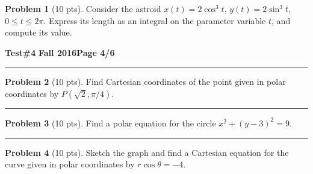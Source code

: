 \documentclass[12pt]{article}
\theoremstyle{definition}
\newtheorem{problem}{Problem}
\begin{document}
\begin{problem}[10 pts]
Consider the astroid $x(t) = 2\cos^3 t$, $y(t) = 2\sin^3 t$, $0 \leq t \leq 2\pi$.  Express its length as an integral on the parameter variable $t$, and compute its value.
\end{problem}
\vspace{4.5cm}
\begin{flushright}
\end{flushright}
\newpage

\hfill{\large\bf Test\#4}\hfill{\large\bf
  Fall 2016}\hfill{\large\bf Page 4/6}\hrule

\bigskip
\begin{problem}[10 pts]
Find Cartesian coordinates of the point given in polar coordinates by $P(\sqrt{2}, \pi/4)$.
\vspace{3.5cm}
\begin{flushright}
\end{flushright}
\end{problem}
\hrule

\begin{problem}[10 pts]
Find a polar equation for the circle $x^2 + (y-3)^2 = 9$.
\vspace{5.5cm}
\begin{flushright}
\end{flushright}
\end{problem}
\hrule

\begin{problem}[10 pts]
Sketch the graph and find a Cartesian equation for the curve given in polar coordinates by $r \cos \theta = -4$.
\vspace{6cm}
\begin{flushright}
\end{flushright}
\end{problem}
\newpage
\end{document}
